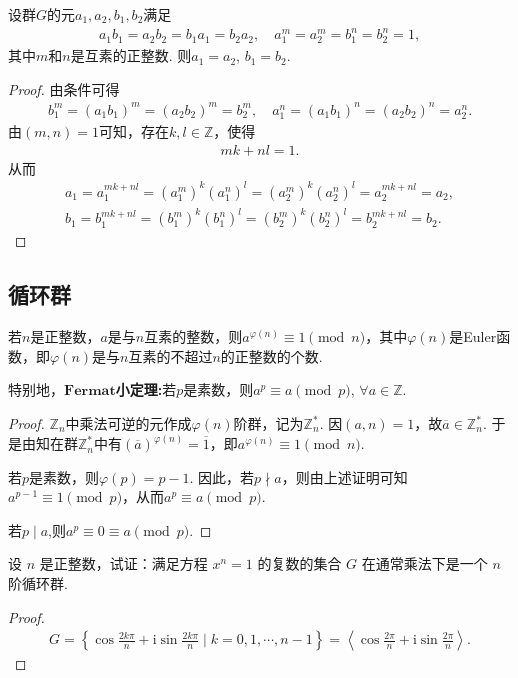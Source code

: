 \documentclass[../../main.tex]{subfiles}%
\begin{document}
\begin{example}
设群$G$的元$a_1, a_2, b_1, b_2$满足
\begin{align*}
a_1b_1 = a_2b_2 = b_1a_1 = b_2a_2,\quad a_1^m = a_2^m = b_1^n = b_2^n = 1,
\end{align*}
其中$m$和$n$是互素的正整数. 则$a_1 = a_2$, $b_1 = b_2$.
\end{example}
\begin{proof}
由条件可得
\begin{align*}
b_1^m=(a_1b_1)^m=(a_2b_2)^m=b_2^m,\quad a_1^n=(a_1b_1)^n=(a_2b_2)^n=a_2^n.
\end{align*}
由$(m,n)=1$可知，存在$k,l\in\mathbb{Z}$，使得
\begin{align*}
mk+nl=1.
\end{align*}
从而
\begin{align*}
a_1=a_1^{mk+nl}=(a_1^m)^k(a_1^n)^l=(a_2^m)^k(a_2^n)^l=a_2^{mk+nl}=a_2,\\
b_1=b_1^{mk+nl}=(b_1^m)^k(b_1^n)^l=(b_2^m)^k(b_2^n)^l=b_2^{mk+nl}=b_2.
\end{align*}
\end{proof}

\subsection{循环群}

\begin{theorem}[Euler定理]\label{theorem:Euler定理}
若$n$是正整数，$a$是与$n$互素的整数，则$a^{\varphi(n)} \equiv 1 \pmod{n}$，其中$\varphi(n)$是Euler函数，即$\varphi(n)$是与$n$互素的不超过$n$的正整数的个数.

特别地，$\mathbf{Fermat}$\textbf{小定理:}若$p$是素数，则$a^p \equiv a \pmod{p}$, $\forall a \in \mathbb{Z}$.
\end{theorem}
\begin{proof}

$\mathbb{Z}_n$中乘法可逆的元作成$\varphi(n)$阶群，记为$\mathbb{Z}_n^*$. 因$(a,n)=1$，故$\overline{a} \in \mathbb{Z}_n^*$. 于是由知在群$\mathbb{Z}_n^*$中有$(\overline{a})^{\varphi(n)} = \overline{1}$，即$a^{\varphi(n)} \equiv 1 \pmod{n}$.

若$p$是素数，则$\varphi(p)=p-1$. 因此，若$p \nmid a$，则由上述证明可知$a^{p-1} \equiv 1 \pmod{p}$，从而$a^p \equiv a \pmod{p}$. 

若$p \mid a$,则$a^p\equiv 0\equiv a\pmod{p}$.
\end{proof}

\begin{example}
设 \( n \) 是正整数，试证：满足方程 \( x^n = 1 \) 的复数的集合 \( G \) 在通常乘法下是一个 \( n \) 阶循环群.
\end{example}
\begin{proof}
\begin{align*}
G = \left\{ \cos \frac{2k\pi}{n} + \mathrm{i} \sin \frac{2k\pi}{n} \mid k = 0, 1, \cdots, n-1 \right\} = \left\langle \cos \frac{2\pi}{n} + \mathrm{i} \sin \frac{2\pi}{n} \right\rangle.
\end{align*}
\end{proof}
\end{document}
